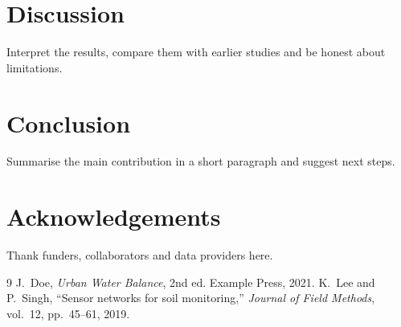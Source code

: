 \documentclass[11pt,a4paper]{article}
\begin{document}
\section{Discussion}
\label{sec:discussion}
Interpret the results, compare them with earlier studies and be honest about limitations.

\section{Conclusion}
Summarise the main contribution in a short paragraph and suggest next steps.

\section*{Acknowledgements}
Thank funders, collaborators and data providers here.

\begin{thebibliography}{9}
 J.~Doe, \emph{Urban Water Balance}, 2nd ed. Example Press, 2021.
 K.~Lee and P.~Singh, ``Sensor networks for soil monitoring,'' \emph{Journal of Field Methods}, vol.~12, pp.~45--61, 2019.
\end{thebibliography}
\end{document}

